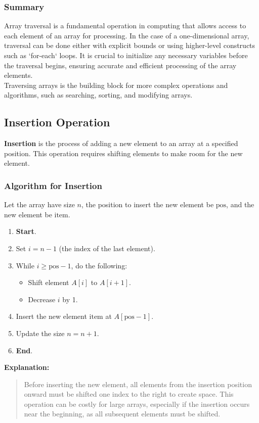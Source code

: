 \documentclass[12pt, oneside]{book}
\begin{document}
\subsubsection{Summary}
Array traversal is a fundamental operation in computing that allows access to each element of an array for processing. In the case of a one-dimensional array, traversal can be done either with explicit bounds or using higher-level constructs such as `for-each` loops. It is crucial to initialize any necessary variables before the traversal begins, ensuring accurate and efficient processing of the array elements.\\Traversing arrays is the building block for more complex operations and algorithms, such as searching, sorting, and modifying arrays.

\subsection{Insertion Operation}
\textbf{Insertion} is the process of adding a new element to an array at a specified position. This operation requires shifting elements to make room for the new element.

\subsubsection*{Algorithm for Insertion}
Let the array have size $n$, the position to insert the new element be $\text{pos}$, and the new element be $\text{item}$.

\begin{enumerate}
	\item \textbf{Start}.
	\item Set $i = n - 1$ (the index of the last element).
	\item While $i \geq \text{pos} - 1$, do the following:
	\begin{itemize}
		\item Shift element $A[i]$ to $A[i + 1]$.
		\item Decrease $i$ by 1.
	\end{itemize}
	\item Insert the new element $\text{item}$ at $A[\text{pos} - 1]$.
	\item Update the size $n = n + 1$.
	\item \textbf{End}.
\end{enumerate}


\textbf{Explanation:}
\begin{quote}
	Before inserting the new element, all elements from the insertion position onward must be shifted one index to the right to create space. This operation can be costly for large arrays, especially if the insertion occurs near the beginning, as all subsequent elements must be shifted.
\end{quote}
\end{document}

